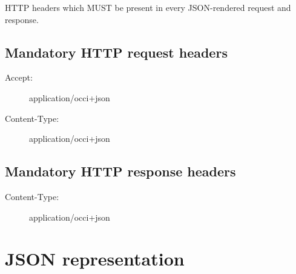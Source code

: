 \documentclass[10pt,a4paper]{article}
\begin{document}
HTTP headers which MUST be present in every JSON-rendered request and response.

\subsection{Mandatory HTTP request headers}
\begin{description}
\item[Accept:] application/occi+json
\item[Content-Type:] application/occi+json
\end{description}

\subsection{Mandatory HTTP response headers}
\begin{description}
\item[Content-Type:] application/occi+json
\end{description}

\section{JSON representation}
\end{document}
